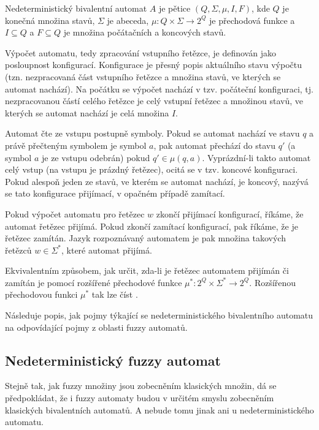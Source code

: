 \documentclass[a4paper,10pt]{article}
\begin{document}
\begin{definition}\label{def-NedBivAut}
 Nedeterministický bivalentní automat $A$ je pětice $(Q, \Sigma, \mu, I, F)$, kde $Q$ je konečná množina stavů, $\Sigma$ je abeceda, $\mu: Q \times \Sigma \rightarrow 2^Q$ je přechodová funkce a $I \subseteq Q$ a $F \subseteq Q$ je množina počátačních a koncových stavů.
\end{definition}


Výpočet automatu, tedy zpracování vstupního řetězce, je definován jako posloupnost konfigurací. Konfigurace je přesný popis aktuálního stavu výpočtu (tzn. nezpracovaná část vstupního řetězce a množina stavů, ve kterých se automat nachází). Na počátku se výpočet nachází v tzv. počáteční konfiguraci, tj. nezpracovanou částí celého řetězce je celý vstupní řetězec a množinou stavů, ve kterých se automat nachází je celá množina $I$.

Automat čte ze vstupu postupně symboly. Pokud se automat nachází ve stavu $q$ a právě přečteným symbolem je symbol $a$, pak automat přechází do stavu $q'$ (a symbol $a$ je ze vstupu odebrán) pokud $q' \in \mu(q, a)$. Vyprázdní-li takto automat celý vstup (na vstupu je prázdný řetězec), ocitá se v tzv. koncové konfiguraci. Pokud alespoň jeden ze stavů, ve kterém se automat nachází, je koncový, nazývá se tato konfigurace přijímací, v opačném případě zamítací.

Pokud výpočet automatu pro řetězec $w$ zkončí přijímací konfigurací, říkáme, že automat řetězec přijímá. Pokud zkončí zamítací konfigurací, pak říkáme, že je řetězec zamítán. Jazyk rozpoznávaný automatem je pak množina takových řetězců $w \in \Sigma^*$, které automat přijímá.

Ekvivalentním způsobem, jak určit, zda-li je řetězec automatem přijímán či zamítán je pomocí rozšířené přechodové funkce $\mu^*: 2^Q \times \Sigma^* \rightarrow 2^Q$. Rozšířenou přechodovou funkci $\mu^*$ tak lze číst .  

Následuje popis, jak pojmy týkající se nedeterministického bivalentního automatu  na odpovídající pojmy z oblasti fuzzy automatů. 

\subsection{Nedeterministický fuzzy automat}
Stejně tak, jak fuzzy množiny jsou zobecněním klasických  množin, dá se předpokládat, že i fuzzy automaty budou v určitém smyslu zobecněním klasických bivalentních automatů. A nebude tomu jinak ani u nedeterministického automatu.
\end{document}
